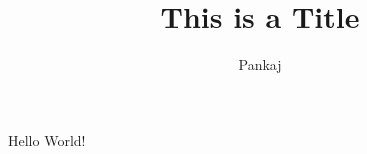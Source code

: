 \documentclass{pkStudyNotes}
\begin{document}
    \title{This is a Title}
    \author{Pankaj}
    \maketitle
    Hello World!
    
\end{document}
